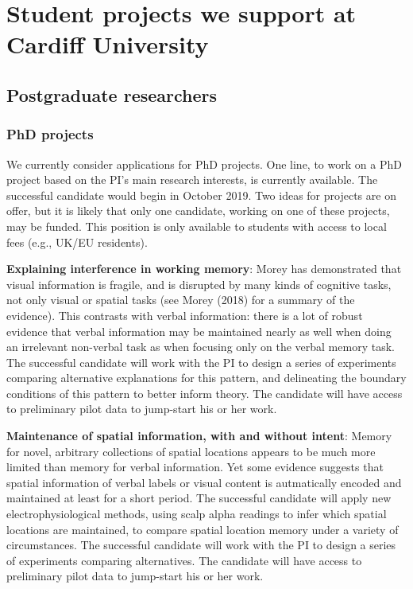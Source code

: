 \documentclass[12pt,]{book}
\theoremstyle{definition}
\theoremstyle{definition}
\theoremstyle{definition}
\theoremstyle{remark}
\begin{document}
\chapter{Student projects we support at Cardiff
University}\label{student-projects-we-support-at-cardiff-university}

\section{Postgraduate researchers}\label{postgraduate-researchers}

\subsection{PhD projects}\label{phd-projects}

We currently consider applications for PhD projects. One line, to work
on a PhD project based on the PI's main research interests, is currently
available. The successful candidate would begin in October 2019. Two
ideas for projects are on offer, but it is likely that only one
candidate, working on one of these projects, may be funded. This
position is only available to students with access to local fees (e.g.,
UK/EU residents).

\textbf{Explaining interference in working memory}: Morey has
demonstrated that visual information is fragile, and is disrupted by
many kinds of cognitive tasks, not only visual or spatial tasks (see
Morey (2018) for a summary of the evidence). This contrasts with verbal
information: there is a lot of robust evidence that verbal information
may be maintained nearly as well when doing an irrelevant non-verbal
task as when focusing only on the verbal memory task. The successful
candidate will work with the PI to design a series of experiments
comparing alternative explanations for this pattern, and delineating the
boundary conditions of this pattern to better inform theory. The
candidate will have access to preliminary pilot data to jump-start his
or her work.

\textbf{Maintenance of spatial information, with and without intent}:
Memory for novel, arbitrary collections of spatial locations appears to
be much more limited than memory for verbal information. Yet some
evidence suggests that spatial information of verbal labels or visual
content is autmatically encoded and maintained at least for a short
period. The successful candidate will apply new electrophysiological
methods, using scalp alpha readings to infer which spatial locations are
maintained, to compare spatial location memory under a variety of
circumstances. The successful candidate will work with the PI to design
a series of experiments comparing alternatives. The candidate will have
access to preliminary pilot data to jump-start his or her work.
\end{document}
